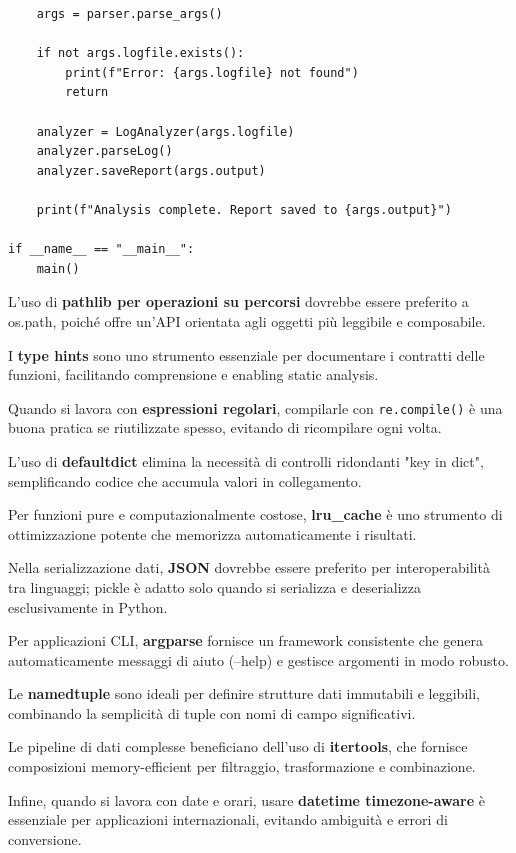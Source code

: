 \begin{lstlisting}
    args = parser.parse_args()

    if not args.logfile.exists():
        print(f"Error: {args.logfile} not found")
        return

    analyzer = LogAnalyzer(args.logfile)
    analyzer.parseLog()
    analyzer.saveReport(args.output)

    print(f"Analysis complete. Report saved to {args.output}")

if __name__ == "__main__":
    main()
\end{lstlisting}

\begin{tcolorbox}[title=Best Practices]
L'uso di \textbf{pathlib per operazioni su percorsi} dovrebbe essere preferito a os.path, poiché offre un'API orientata agli oggetti più leggibile e composabile.

I \textbf{type hints} sono uno strumento essenziale per documentare i contratti delle funzioni, facilitando comprensione e enabling static analysis.

Quando si lavora con \textbf{espressioni regolari}, compilarle con \verb|re.compile()| è una buona pratica se riutilizzate spesso, evitando di ricompilare ogni volta.

L'uso di \textbf{defaultdict} elimina la necessità di controlli ridondanti "key in dict", semplificando codice che accumula valori in collegamento.

Per funzioni pure e computazionalmente costose, \textbf{lru\_cache} è uno strumento di ottimizzazione potente che memorizza automaticamente i risultati.

Nella serializzazione dati, \textbf{JSON} dovrebbe essere preferito per interoperabilità tra linguaggi; pickle è adatto solo quando si serializza e deserializza esclusivamente in Python.

Per applicazioni CLI, \textbf{argparse} fornisce un framework consistente che genera automaticamente messaggi di aiuto (--help) e gestisce argomenti in modo robusto.

Le \textbf{namedtuple} sono ideali per definire strutture dati immutabili e leggibili, combinando la semplicità di tuple con nomi di campo significativi.

Le pipeline di dati complesse beneficiano dell'uso di \textbf{itertools}, che fornisce composizioni memory-efficient per filtraggio, trasformazione e combinazione.

Infine, quando si lavora con date e orari, usare \textbf{datetime timezone-aware} è essenziale per applicazioni internazionali, evitando ambiguità e errori di conversione.
\end{tcolorbox}

